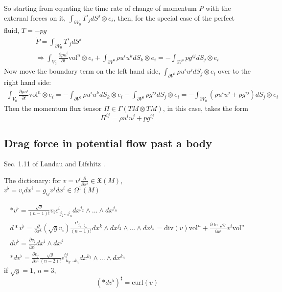\documentclass[twoside,landscape,10pt]{amsart}
\theoremstyle{plain}
\theoremstyle{definition}
\theoremstyle{remark}
\theoremstyle{remark}
\begin{document}
\begin{multicols*}{2}
So starting from equating the time rate of change of momentum $\dot{P}$ with the external forces on it, $\int_{\partial V_0} T^i_{\,\,j}dS^j \otimes e_i$, then, for the special case of the perfect fluid, $T = -pg$
\[
\begin{gathered}
  \dot{P} = \int_{\partial V_0} T^i_{\,\,j}dS^j \\ 
  \Longrightarrow \int_{V_0} \frac{ \partial \rho u^i}{ \partial t} \text{vol}^n \otimes e_i + \int_{\partial V^0} \rho u^i u^k dS_k \otimes e_i = - \int_{\partial V^0} p g^{ij} dS_j \otimes e_i
\end{gathered}
\]
Now move the boundary term on the left hand side, $\int_{\partial V^0} \rho u^i u^j dS_j \otimes e_i$ over to the right hand side:
\[
\begin{gathered}
\int_{V_0} \frac{ \partial \rho u^i}{ \partial t} \text{vol}^n \otimes e_i  = -  \int_{\partial V^0} \rho u^i u^k dS_k \otimes e_i - \int_{\partial V^0} p g^{ij} dS_j \otimes e_i = -\int_{\partial V_0} (\rho u^i u^j + p g^{ij}) dS_j \otimes e_i
\end{gathered}
\]
Then the momentum flux tensor $\Pi \in \Gamma(TM\otimes TM)$, in this case, takes the form
\[
\Pi^{ij} = \rho u^i u^j + p g^{ij}
\]

\subsection*{Drag force in potential flow past a body}

Sec. 1.11 of Landau and Lifshitz \cite{LLandauELifshitz1987}.  

The dictionary: for $v = v^i \frac{\partial }{ \partial x^i} \in \mathfrak{X}(M)$, \\
$v^{\flat} = v_i dx^i = g_{ij} v^j dx^i \in \Omega^1(M)$

\[
\begin{gathered}
  *v^{\flat} = \frac{ \sqrt{g}}{(n-1)!} v_i \epsilon^i_{ \,\, j_2 \dots j_n} dx^{j_2} \wedge \dots \wedge dx^{j_n} \\ 
  d*v^{\flat} = \frac{ \partial }{ \partial x^k} (\sqrt{g} v_i) \frac{ \epsilon^i_{ \,\, j_2 \dots j_n} }{(n-1)!} dx^k \wedge dx^{j_2} \wedge \dots \wedge dx^{j_n} = \text{div}(v) \text{vol}^n + \frac{ \partial \ln{ \sqrt{g}}}{ \partial x^i} v^i \text{vol}^n \\ 
  dv^{\flat} = \frac{ \partial v_j}{ \partial x^j} dx^i \wedge dx^j \\ 
  *dv^{\flat} = \frac{ \partial v_j}{ \partial x^i} \frac{ \sqrt{g}}{ (n-2)!} \epsilon^{ij}_{ \,\, k_3 \dots k_n} dx^{k_3} \wedge \dots \wedge dx^{k_n} 
\end{gathered}
\]
if $\sqrt{g} =1$, $n=3$, 
\[
(*dv^{\flat})^{\sharp} = \text{curl}(v)
\]


\end{multicols*}
\end{document}

